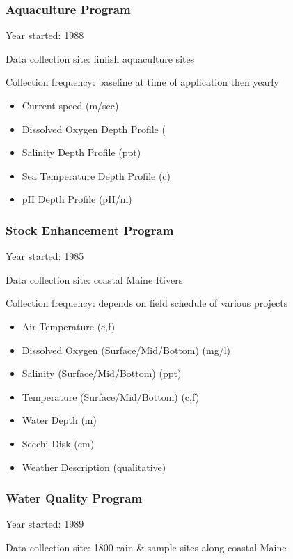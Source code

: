 \subsubsection{Aquaculture Program}

Year started: 1988

Data collection site: finfish aquaculture sites

Collection frequency: baseline at time of application then yearly 

\begin{itemize}
\item Current speed (m/sec)
\item Dissolved Oxygen Depth Profile (%
\item Salinity Depth Profile (ppt)
\item Sea Temperature Depth Profile (c)
\item pH Depth Profile  (pH/m)
\end{itemize}

\subsubsection{Stock Enhancement Program}

Year started: 1985

Data collection site: coastal Maine Rivers

Collection frequency: depends on field schedule of various projects

\begin{itemize}
\item Air Temperature (c,f)
\item Dissolved Oxygen (Surface/Mid/Bottom) (mg/l)
\item Salinity (Surface/Mid/Bottom) (ppt)
\item Temperature (Surface/Mid/Bottom) (c,f)
\item Water Depth (m)
\item Secchi Disk (cm)
\item Weather Description (qualitative)
\end{itemize}

\subsubsection{Water Quality Program}

Year started: 1989

Data collection site: 1800 rain \& sample sites along coastal Maine

